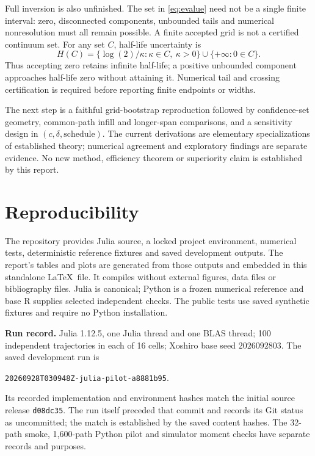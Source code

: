 \documentclass[11pt]{article}
\begin{document}
Full inversion is also unfinished. The set in \eqref{eq:evalue} need not be a
single finite interval: zero, disconnected components, unbounded tails and
numerical nonresolution must all remain possible. A finite accepted grid is
not a certified continuum set. For any set $C$, half-life uncertainty is
\[
 H(C)=\{\log(2)/\kappa:\kappa\in C,\ \kappa>0\}
 \cup\{+\infty:0\in C\}.
\]
Thus accepting zero retains infinite half-life; a positive unbounded component
approaches half-life zero without attaining it. Numerical tail and crossing
certification is required before reporting finite endpoints or widths.

The next step is a faithful grid-bootstrap reproduction followed by confidence-set
geometry, common-path infill and longer-span comparisons, and a sensitivity
design in $(c,\delta,\text{schedule})$. The current derivations are elementary
specializations of established theory; numerical agreement and exploratory
findings are separate evidence. No new method, efficiency theorem or superiority
claim is established by this report.

\section{Reproducibility}
The repository provides Julia source, a locked project environment, numerical
tests, deterministic reference fixtures and saved development outputs. The report's
tables and plots are generated from those outputs and embedded in this standalone
\LaTeX\ file. It compiles without external figures, data files or bibliography
files. Julia is canonical; Python is a frozen numerical reference and base R
supplies selected independent checks. The public tests use saved synthetic
fixtures and require no Python installation.

\textbf{Run record.} Julia 1.12.5, one Julia thread and one BLAS thread;
100 independent trajectories in each of 16 cells; Xoshiro base seed $2026092803$.
The saved development run is
\begin{center}\small\texttt{20260928T030948Z-julia-pilot-a8881b95}.\end{center}
Its recorded implementation and environment hashes match the initial source
release \texttt{d08dc35}. The run itself preceded that commit and records its
Git status as uncommitted; the match is established by the saved content hashes.
The 32-path smoke, 1,600-path Python pilot and simulator moment checks have
separate records and purposes.
\end{document}
